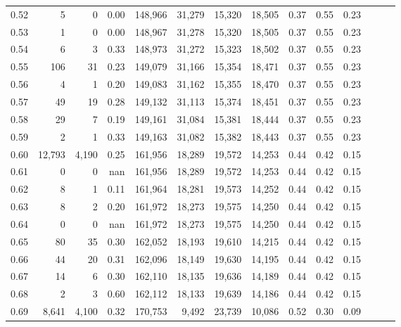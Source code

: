 \begin{tabular}{rrrrrrrrrrrrrr}
0.52 &       5 &      0 &  0.00 &  148,966 &   31,279 &  15,320 &  18,505 &  0.37 &  0.55 &      0.23 \\
0.53 &       1 &      0 &  0.00 &  148,967 &   31,278 &  15,320 &  18,505 &  0.37 &  0.55 &      0.23 \\
0.54 &       6 &      3 &  0.33 &  148,973 &   31,272 &  15,323 &  18,502 &  0.37 &  0.55 &      0.23 \\
0.55 &     106 &     31 &  0.23 &  149,079 &   31,166 &  15,354 &  18,471 &  0.37 &  0.55 &      0.23 \\
0.56 &       4 &      1 &  0.20 &  149,083 &   31,162 &  15,355 &  18,470 &  0.37 &  0.55 &      0.23 \\
0.57 &      49 &     19 &  0.28 &  149,132 &   31,113 &  15,374 &  18,451 &  0.37 &  0.55 &      0.23 \\
0.58 &      29 &      7 &  0.19 &  149,161 &   31,084 &  15,381 &  18,444 &  0.37 &  0.55 &      0.23 \\
0.59 &       2 &      1 &  0.33 &  149,163 &   31,082 &  15,382 &  18,443 &  0.37 &  0.55 &      0.23 \\
0.60 &  12,793 &  4,190 &  0.25 &  161,956 &   18,289 &  19,572 &  14,253 &  0.44 &  0.42 &      0.15 \\
0.61 &       0 &      0 &   nan &  161,956 &   18,289 &  19,572 &  14,253 &  0.44 &  0.42 &      0.15 \\
0.62 &       8 &      1 &  0.11 &  161,964 &   18,281 &  19,573 &  14,252 &  0.44 &  0.42 &      0.15 \\
0.63 &       8 &      2 &  0.20 &  161,972 &   18,273 &  19,575 &  14,250 &  0.44 &  0.42 &      0.15 \\
0.64 &       0 &      0 &   nan &  161,972 &   18,273 &  19,575 &  14,250 &  0.44 &  0.42 &      0.15 \\
0.65 &      80 &     35 &  0.30 &  162,052 &   18,193 &  19,610 &  14,215 &  0.44 &  0.42 &      0.15 \\
0.66 &      44 &     20 &  0.31 &  162,096 &   18,149 &  19,630 &  14,195 &  0.44 &  0.42 &      0.15 \\
0.67 &      14 &      6 &  0.30 &  162,110 &   18,135 &  19,636 &  14,189 &  0.44 &  0.42 &      0.15 \\
0.68 &       2 &      3 &  0.60 &  162,112 &   18,133 &  19,639 &  14,186 &  0.44 &  0.42 &      0.15 \\
0.69 &   8,641 &  4,100 &  0.32 &  170,753 &    9,492 &  23,739 &  10,086 &  0.52 &  0.30 &      0.09 \\

\end{tabular}
